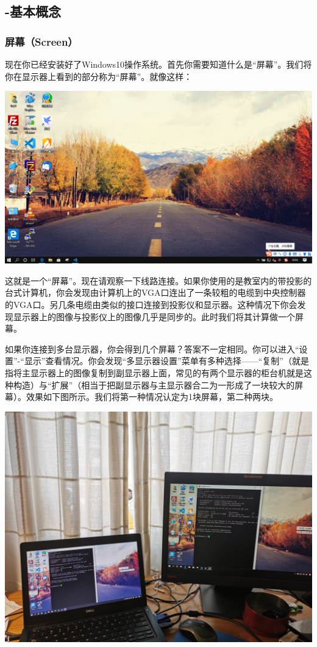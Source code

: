 \subsection{-基本概念}
\subsubsection{屏幕（Screen）}
现在你已经安装好了Windows10操作系统。首先你需要知道什么是“屏幕”。我们将你在显示器上看到的部分称为“屏幕”。就像这样：
\begin{center}
	\includegraphics[scale=0.5]{pic/screen}
\end{center} \par
这就是一个“屏幕”。现在请观察一下线路连接。如果你使用的是教室内的带投影的台式计算机，你会发现由计算机上的VGA口连出了一条较粗的电缆到中央控制器的VGA口。另几条电缆由类似的接口连接到投影仪和显示器。这种情况下你会发现显示器上的图像与投影仪上的图像几乎是同步的。此时我们将其计算做一个屏幕。\par
如果你连接到多台显示器，你会得到几个屏幕？答案不一定相同。你可以进入“设置”-“显示”查看情况。你会发现“多显示器设置”菜单有多种选择——“复制”（就是指将主显示器上的图像复制到副显示器上面，常见的有两个显示器的柜台机就是这种构造）与“扩展”（相当于把副显示器与主显示器合二为一形成了一块较大的屏幕）。效果如下图所示。我们将第一种情况认定为1块屏幕，第二种两块。
\begin{center}
	\includegraphics[scale=0.15]{pic/ScrCopy}
\end{center} 
